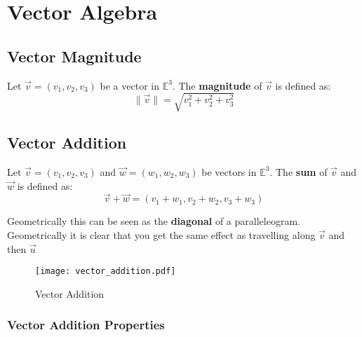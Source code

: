 \section{Vector Algebra}

\subsection{Vector Magnitude}

\begin{definition}
  Let $\vec{v} = (v_1, v_2, v_3)$ be a vector in $\mathbb{E}^3$. The \textbf{magnitude} of $\vec{v}$ is defined as:
  \begin{equation}
    \|\vec{v}\| = \sqrt{v_1^2 + v_2^2 + v_3^2}
  \end{equation}
\end{definition}

\subsection{Vector Addition}

\begin{definition}
  Let $\vec{v} = (v_1, v_2, v_3)$ and $\vec{w} = (w_1, w_2, w_3)$ be vectors in $\mathbb{E}^3$. The \textbf{sum} of $\vec{v}$ and $\vec{w}$ is defined as:
  \begin{equation}
    \vec{v} + \vec{w} = (v_1 + w_1, v_2 + w_2, v_3 + w_3)
  \end{equation}
\end{definition}

Geometrically this can be seen as the {\bf diagonal} of a paralleleogram. Geometrically it is clear that you get the same effect as travelling along $\vec{v}$ and then $\vec{u}$

\begin{figure}[H]
\centering
   \texttt{[image: vector\_addition.pdf]}
   \caption{Vector Addition} 
   \label{fig:figure-2-vector-addition}
\end{figure}

\clearpage

\subsubsection*{Vector Addition Properties}
\vspace{5px}
 

